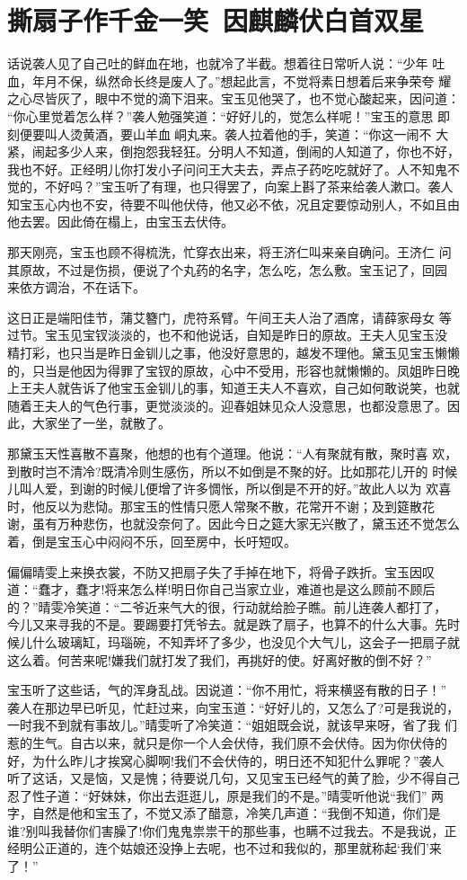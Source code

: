 \chapter{撕扇子作千金一笑~因麒麟伏白首双星}

话说袭人见了自己吐的鲜血在地，也就冷了半截。想着往日常听人说：“少年
吐血，年月不保，纵然命长终是废人了。”想起此言，不觉将素日想着后来争荣夸
耀之心尽皆灰了，眼中不觉的滴下泪来。宝玉见他哭了，也不觉心酸起来，因问道：
“你心里觉着怎么样？”袭人勉强笑道：“好好儿的，觉怎么样呢！”宝玉的意思
即刻便要叫人烫黄酒，要山羊血峒丸来。袭人拉着他的手，笑道：“你这一闹不
大紧，闹起多少人来，倒抱怨我轻狂。分明人不知道，倒闹的人知道了，你也不好，
我也不好。正经明儿你打发小子问问王大夫去，弄点子药吃吃就好了。人不知鬼不
觉的，不好吗？”宝玉听了有理，也只得罢了，向案上斟了茶来给袭人漱口。袭人
知宝玉心内也不安，待要不叫他伏侍，他又必不依，况且定要惊动别人，不如且由
他去罢。因此倚在榻上，由宝玉去伏侍。

那天刚亮，宝玉也顾不得梳洗，忙穿衣出来，将王济仁叫来亲自确问。王济仁
问其原故，不过是伤损，便说了个丸药的名字，怎么吃，怎么敷。宝玉记了，回园
来依方调治，不在话下。

这日正是端阳佳节，蒲艾簪门，虎符系臂。午间王夫人治了酒席，请薛家母女
等过节。宝玉见宝钗淡淡的，也不和他说话，自知是昨日的原故。王夫人见宝玉没
精打彩，也只当是昨日金钏儿之事，他没好意思的，越发不理他。黛玉见宝玉懒懒
的，只当是他因为得罪了宝钗的原故，心中不受用，形容也就懒懒的。凤姐昨日晚
上王夫人就告诉了他宝玉金钏儿的事，知道王夫人不喜欢，自己如何敢说笑，也就
随着王夫人的气色行事，更觉淡淡的。迎春姐妹见众人没意思，也都没意思了。因
此，大家坐了一坐，就散了。

那黛玉天性喜散不喜聚，他想的也有个道理。他说：“人有聚就有散，聚时喜
欢，到散时岂不清冷?既清冷则生感伤，所以不如倒是不聚的好。比如那花儿开的
时候儿叫人爱，到谢的时候儿便增了许多惆怅，所以倒是不开的好。”故此人以为
欢喜时，他反以为悲恸。那宝玉的性情只愿人常聚不散，花常开不谢；及到筵散花
谢，虽有万种悲伤，也就没奈何了。因此今日之筵大家无兴散了，黛玉还不觉怎么
着，倒是宝玉心中闷闷不乐，回至房中，长吁短叹。

偏偏晴雯上来换衣裳，不防又把扇子失了手掉在地下，将骨子跌折。宝玉因叹
道：“蠢才，蠢才!将来怎么样!明日你自己当家立业，难道也是这么顾前不顾后
的？”晴雯冷笑道：“二爷近来气大的很，行动就给脸子瞧。前儿连袭人都打了，
今儿又来寻我的不是。要踢要打凭爷去。就是跌了扇子，也算不的什么大事。先时
候儿什么玻璃缸，玛瑙碗，不知弄坏了多少，也没见个大气儿，这会子一把扇子就
这么着。何苦来呢!嫌我们就打发了我们，再挑好的使。好离好散的倒不好？”

宝玉听了这些话，气的浑身乱战。因说道：“你不用忙，将来横竖有散的日子！”
袭人在那边早已听见，忙赶过来，向宝玉道：“好好儿的，又怎么了?可是我说的，
一时我不到就有事故儿。”晴雯听了冷笑道：“姐姐既会说，就该早来呀，省了我
们惹的生气。自古以来，就只是你一个人会伏侍，我们原不会伏侍。因为你伏侍的
好，为什么昨儿才挨窝心脚啊!我们不会伏侍的，明日还不知犯什么罪呢？”袭人
听了这话，又是恼，又是愧；待要说几句，又见宝玉已经气的黄了脸，少不得自己
忍了性子道：“好妹妹，你出去逛逛儿，原是我们的不是。”晴雯听他说“我们”
两字，自然是他和宝玉了，不觉又添了醋意，冷笑几声道：“我倒不知道，你们是
谁?别叫我替你们害臊了!你们鬼鬼祟祟干的那些事，也瞒不过我去。不是我说，正
经明公正道的，连个姑娘还没挣上去呢，也不过和我似的，那里就称起‘我们’来
了！”

